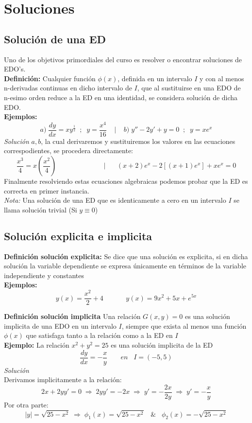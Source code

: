\documentclass[10pt]{article}
\begin{document}
\section{Soluciones}
\subsection{Solución de una ED}
Uno de los objetivos primordiales del curso es resolver o encontrar soluciones de EDO's.\\
\textbf{Definición:} Cualquier función $\phi(x)$, definida en un intervalo $I$ y con al menos n-derivadas continuas en dicho intervalo de $I$, que al sustituirse en una EDO de n-esimo orden reduce a la ED en una identidad, se considera solución de dicha EDO.
\\\textbf{Ejemplos:}
\[a)\;\frac{dy}{dx}=xy^{\frac{1}{2}}\;\;;\;\;y=\frac{x^{4}}{16}\;\;\;\;|\;\;\;\;b)\;y''-2y'+y=0\;\;;\;\;y=xe^{x}\]
\textit{Solución} $a,b$, la cual derivaremos y sustituiremos los valores en las ecuaciones correspodientes, se procedera directamente:
\[\frac{x^{3}}{4}=x\left(\frac{x^{2}}{4}\right)\;\;\;\;\;\;\;\;\;\;\;\;\;\;\;\;\;\;\;\;\;\;\;\;\;|\;\;\;\;\;\;(x+2)e^{x}-2[(x+1)e^{x}]+xe^{x}=0\]
Finalmente resolviendo estas ecuaciones algebraicas podemos probar que la ED es correcta en primer instancia.\\
\textit{Nota:} Una solución de una ED que es identicamente a cero en un intervalo $I$ se llama solución trivial (Si $y\equiv0$)

\subsection{Solución explicita e implicita}
\textbf{Definición solución explicita:} Se dice que una solución es explicita, si en dicha solución la variable dependiente se expresa únicamente en términos de la variable independiente y constantes
\\\textbf{Ejemplos:}
\[y(x)=\frac{x^{2}}{2}+4\;\;\;\;\;\;\;\;\;\;\;\;y(x)=9x^{2}+5x+e^{5x}\]

\textbf{Definición solución implicita} Una relación $G(x,y)=0$ es una solución implicita de una EDO en un intervalo $I$, siempre que exista al menos una función $\phi(x)$ que satisfaga tanto a la relación como  a la ED en $I$
\\\textbf{Ejemplo:}
La relación $x^{2}+y^{2}=25$ es una solución implicita de la ED
\[\frac{dy}{dx}=-\frac{x}{y}\;\;\;\;\;\;\;en\;\;\;I=(-5,5)\]
\textit{Solución}\\
Derivamos implicitamente a la relación:
\[2x+2yy'=0 \;\Rightarrow\; 2yy'=-2x \;\Rightarrow\; y'=-\frac{2x}{2y}\;\Rightarrow\; y'=-\frac{x}{y}\]
Por otra parte:
\[\left|y\right|=\sqrt{25-x^{2}}\;\Rightarrow\;\phi_{1}(x)=\sqrt{25-x^{2}}\;\;\;\&\;\;\;\phi_{2}(x)=-\sqrt{25-x^{2}}\]
\clearpage
\end{document}
